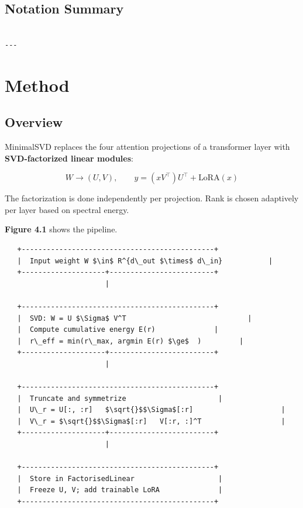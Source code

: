 \subsection{Notation Summary}

\begin{lstlisting}

---
\end{lstlisting}


\section{Method}

\subsection{Overview}

MinimalSVD replaces the four attention projections of a transformer layer 
with \textbf{SVD-factorized linear modules}:

\[
W \to (U, V), \qquad
y = (x V^\top) U^\top + \text{LoRA}(x)
\tag{4.1}
\]

The factorization is done independently per projection. Rank is chosen 
adaptively per layer based on spectral energy.

\textbf{Figure 4.1} shows the pipeline.

\begin{lstlisting}
   +----------------------------------------------+
   |  Input weight W $\in$ R^{d\_out $\times$ d\_in}           |
   +--------------------+-------------------------+
                        |
                         
   +----------------------------------------------+
   |  SVD: W = U $\Sigma$ V^T                             |
   |  Compute cumulative energy E(r)              |
   |  r\_eff = min(r\_max, argmin E(r) $\ge$  )         |
   +--------------------+-------------------------+
                        |
                         
   +----------------------------------------------+
   |  Truncate and symmetrize                      |
   |  U\_r = U[:, :r]   $\sqrt{}$$\Sigma$[:r]                     |
   |  V\_r = $\sqrt{}$$\Sigma$[:r]   V[:r, :]^T                   |
   +--------------------+-------------------------+
                        |
                         
   +----------------------------------------------+
   |  Store in FactorisedLinear                    |
   |  Freeze U, V; add trainable LoRA              |
   +----------------------------------------------+
\end{lstlisting}


